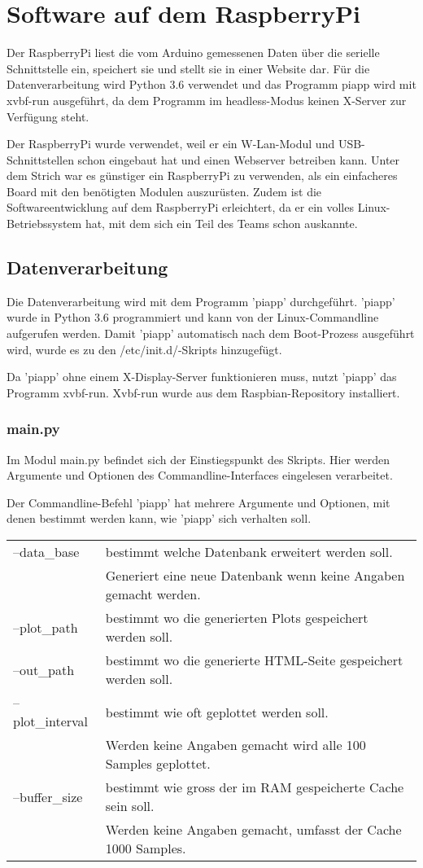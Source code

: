 \documentclass{article}
\begin{document}
\section{Software auf dem RaspberryPi}
Der RaspberryPi liest die vom Arduino gemessenen Daten über die serielle Schnittstelle ein, speichert sie und stellt sie in einer Website dar.
Für die Datenverarbeitung wird Python 3.6 verwendet und das Programm piapp wird mit xvbf-run ausgeführt, da dem Programm im headless-Modus keinen X-Server zur Verfügung steht.

Der RaspberryPi wurde verwendet, weil er ein W-Lan-Modul und USB-Schnittstellen schon eingebaut hat und einen Webserver betreiben kann.
Unter dem Strich war es günstiger ein RaspberryPi zu verwenden, als ein einfacheres Board mit den benötigten Modulen auszurüsten.
Zudem ist die Softwareentwicklung auf dem RaspberryPi erleichtert, da er ein volles Linux-Betriebssystem hat, mit dem sich ein Teil des Teams schon auskannte.

\subsection{Datenverarbeitung}
Die Datenverarbeitung wird mit dem Programm 'piapp' durchgeführt.
'piapp' wurde in Python 3.6 programmiert und kann von der Linux-Commandline aufgerufen werden.
Damit 'piapp' automatisch nach dem Boot-Prozess ausgeführt wird, wurde es zu den /etc/init.d/-Skripts hinzugefügt.

Da 'piapp' ohne einem X-Display-Server funktionieren muss, nutzt 'piapp' das Programm xvbf-run.
Xvbf-run wurde aus dem Raspbian-Repository installiert.

\subsubsection{main.py}
Im Modul main.py befindet sich der Einstiegspunkt des Skripts.
Hier werden Argumente und Optionen des Commandline-Interfaces eingelesen verarbeitet.

Der Commandline-Befehl 'piapp' hat mehrere Argumente und Optionen, mit denen bestimmt werden kann, wie 'piapp' sich verhalten soll.

\begin{tabular}{l l}
--data\_base     & bestimmt welche Datenbank erweitert werden soll. \\
~                & Generiert eine neue Datenbank wenn keine Angaben gemacht werden. \\
--plot\_path     & bestimmt wo die generierten Plots gespeichert werden soll. \\
--out\_path      & bestimmt wo die generierte HTML-Seite gespeichert werden soll. \\
--plot\_interval & bestimmt wie oft geplottet werden soll. \\
~                & Werden keine Angaben gemacht wird alle 100 Samples geplottet. \\
--buffer\_size   & bestimmt wie gross der im RAM gespeicherte Cache sein soll. \\
~                & Werden keine Angaben gemacht, umfasst der Cache 1000 Samples. 
\end{tabular}
\end{document}
